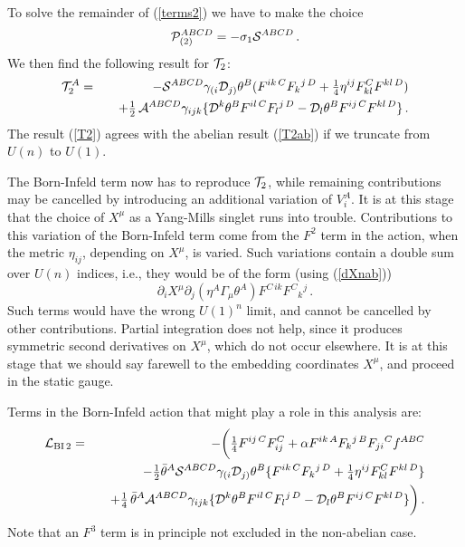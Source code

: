 \documentclass[12pt,a4paper]{article}
\def\half{{\textstyle {1 \over 2}}}
\def\quart{{\textstyle {1 \over 4}}}
\def\noverm#1#2{{\textstyle {#1 \over #2}}}
\def\Dpartial{{\cal D}}
\begin{document}
To solve the remainder of (\ref{terms2}) we have to make the choice
\begin{equation}
   {\cal P}_{(2)}^{ABCD} = -\sigma_1{\cal S}^{ABCD}\,.
\end{equation}
We then find the following result for ${\cal T}_2$:
\begin{eqnarray}
   {\cal T}_2^A &=& -{\cal S}^{ABCD}
     \gamma_{(i}\Dpartial_{j)}\theta^B
              (F^{ik\,C}F_{k}{}^{j\,D} + \quart \eta^{ij} F_{kl}^CF^{kl\,D})
    \nonumber\\
  \label{T2}
  && \quad  +\half\, {\cal A}^{ABCD}
            \gamma_{ijk}
      \{\Dpartial^k\theta^B F^{il\,C} F_l{}^{j\,D}
         - \Dpartial_l\theta^B F^{ij\,C}F^{kl\,D}\}\,.
\end{eqnarray}
The result (\ref{T2}) agrees with the
abelian result (\ref{T2ab}) if we truncate from $U(n)$ to $U(1)$.

The Born-Infeld term now has to reproduce ${\cal T}_2$, while
remaining contributions may be cancelled by
introducing an additional variation of $V_i^A$. It is at this stage that
the choice of $X^\mu$ as a Yang-Mills singlet runs into trouble.
Contributions to this variation of the Born-Infeld term
come from the $F^2$ term in the
action, when the metric $\eta_{ij}$, depending on $X^\mu$, is varied.
Such variations contain a double sum over $U(n)$ indices, i.e.,
they would be of the form (using (\ref{dXnab}))
\begin{equation}
   \partial_iX^\mu \partial_j(\eta^A\Gamma_\mu\theta^A)
       F^{C\,ik} F^{C}{}_k{}^j\,.
\end{equation}
Such terms would have the wrong $U(1)^n$ limit, and cannot be cancelled
by other contributions. Partial integration does not help,
since it produces symmetric second derivatives on $X^\mu$, which
do not occur elsewhere. It is at this stage that we should say
farewell to the embedding coordinates $X^\mu$, and proceed in the static
gauge.

Terms in the Born-Infeld action that might play a role in this analysis are:
\begin{eqnarray}
  {\cal L}_{{\rm BI\,2}} &=& -
     \bigg( \noverm{1}{4}F^{ij\,C}F_{ij}^C
           + \alpha F^{ik\, A}F_k{}^{j\,B}F_{ji}{}^C f^{ABC}
     \nonumber\\
  \label{LBInab2}
     &&\quad
       - \noverm{1}{2} \bar\theta^A {\cal S}^{ABCD}
        \gamma_{(i}\Dpartial_{j)}\theta^B
           \{F^{ik\,C}F_{k}{}^{j\,D} + \quart \eta^{ij} F_{kl}^CF^{kl\,D}\}
     \nonumber\\
     &&\quad
      + \quart\,\bar\theta^A  {\cal A}^{ABCD}
            \gamma_{ijk}
      \{\Dpartial^k\theta^B F^{il\,C} F_l{}^{j\,D}
         - \Dpartial_l\theta^B F^{ij\,C}F^{kl\,D}\} \bigg)\,.
\end{eqnarray}
Note that an $F^3$ term is in principle not excluded in the non-abelian case.
\end{document}
